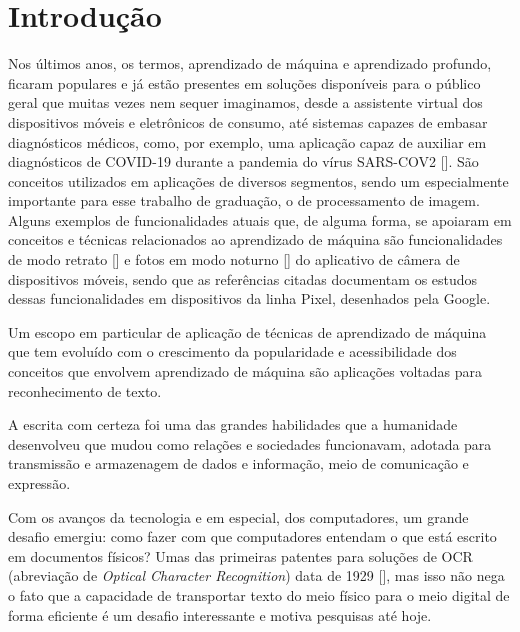 
\chapter[Introdução]{Introdução}

Nos últimos anos, os termos, aprendizado de máquina e aprendizado profundo, ficaram populares e já estão presentes em soluções 
disponíveis para o público geral que muitas vezes nem sequer imaginamos, desde a assistente virtual dos dispositivos móveis e eletrônicos 
de consumo, até sistemas capazes de embasar diagnósticos médicos, como, por exemplo, uma aplicação capaz de auxiliar em diagnósticos de 
COVID-19 durante a pandemia do vírus SARS-COV2 []. São conceitos utilizados em aplicações de diversos segmentos, 
sendo um especialmente importante para esse trabalho de graduação, o de processamento de imagem. Alguns exemplos de funcionalidades atuais 
que, de alguma forma, se apoiaram em conceitos e técnicas relacionados ao aprendizado de máquina são funcionalidades de modo retrato [] 
e fotos em modo noturno [] do aplicativo de câmera de dispositivos móveis, sendo que as referências citadas documentam 
os estudos dessas funcionalidades em dispositivos da linha Pixel, desenhados pela Google.

Um escopo em particular de aplicação de técnicas de aprendizado de máquina que tem evoluído com o crescimento da popularidade e 
acessibilidade dos conceitos que envolvem aprendizado de máquina são aplicações voltadas para reconhecimento de texto. 

A escrita com certeza foi uma das grandes habilidades que a humanidade desenvolveu que mudou como relações e sociedades funcionavam, adotada 
para transmissão e armazenagem de dados e informação, meio de comunicação e expressão.

Com os avanços da tecnologia e em especial, dos computadores, um grande desafio emergiu: como fazer com que computadores entendam o que está 
escrito em documentos físicos? Umas das primeiras patentes para soluções de OCR (abreviação de \textit{Optical Character Recognition}) data 
de 1929 [], mas isso não nega o fato que a capacidade de transportar texto do meio físico para o meio digital de 
forma eficiente é um desafio interessante e motiva pesquisas até hoje.

